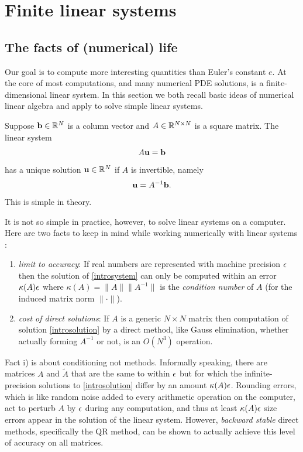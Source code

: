 
\chapter{Finite linear systems}
\label{chap:linearsystem}

\section{The facts of (numerical) life}

Our goal is to compute more interesting quantities than Euler's constant $e$.  At the core of most \PETSc computations, and many numerical PDE solutions, is a finite-dimensional linear system.  In this section we both recall basic ideas of numerical linear algebra and apply \PETSc to solve simple linear systems.

Suppose $\mathbf{b}\in \mathbb{R}^{N}$ is a column vector and $A\in\mathbb{R}^{N\times N}$ is a square matrix.  The linear system
\begin{equation}
A \mathbf{u} = \mathbf{b} \label{introsystem}
\end{equation}
has a unique solution $\mathbf{u}\in \mathbb{R}^{N}$ if $A$ is invertible, namely
\begin{equation}
\mathbf{u} = A^{-1} \mathbf{b}. \label{introsolution}
\end{equation}
This is simple in theory.

It is not so simple in practice, however, to solve linear systems on a computer.  Here are two facts to keep in mind while working numerically with linear systems \citep{TrefethenBau}:
\renewcommand{\labelenumi}{\roman{enumi})}
\begin{enumerate}
\item \label{limittoaccuracy} \emph{limit to accuracy}:  If real numbers are represented with machine precision $\epsilon$ then the solution of \eqref{introsystem} can only be computed within an error $\kappa(A) \epsilon$ where $\kappa(A) = \|A\| \|A^{-1}\|$ is the \emph{condition number} of $A$ (for the induced matrix norm $\|\cdot\|$).
\item \emph{cost of direct solutions}:  If $A$ is a generic $N\times N$ matrix then computation of solution \eqref{introsolution} by a direct method, like Gauss elimination, whether actually forming $A^{-1}$ or not, is an $O(N^3)$ operation.
\end{enumerate}

Fact i) is about conditioning not methods.  Informally speaking, there are matrices $A$ and $\tilde A$ that are the same to within $\epsilon$ but for which the infinite-precision solutions to \eqref{introsolution} differ by an amount $\kappa(A) \epsilon$.  Rounding errors, which is like random noise added to every arithmetic operation on the computer, act to perturb $A$ by $\epsilon$ during any computation, and thus at least $\kappa(A) \epsilon$ size errors appear in the solution of the linear system.  However, \emph{backward stable} direct methods, specifically the QR method, can be shown to actually achieve this level of accuracy on all matrices.

